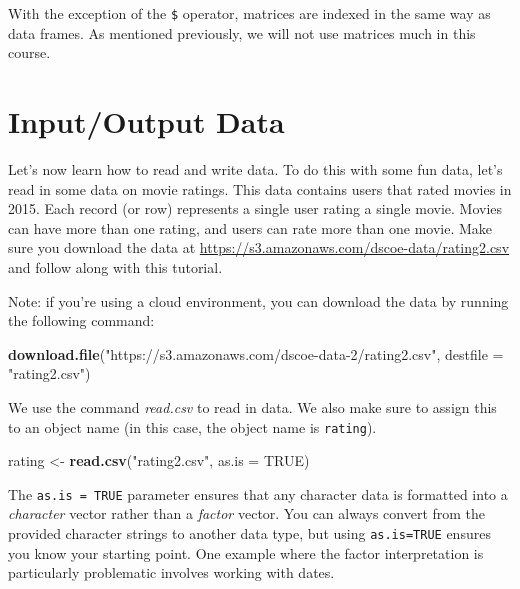 \documentclass[]{book}
\newenvironment{Shaded}{\begin{snugshade}}{\end{snugshade}}
\newcommand{\KeywordTok}[1]{\textcolor[rgb]{0.13,0.29,0.53}{\textbf{{#1}}}}
\newcommand{\DataTypeTok}[1]{\textcolor[rgb]{0.13,0.29,0.53}{{#1}}}
\newcommand{\StringTok}[1]{\textcolor[rgb]{0.31,0.60,0.02}{{#1}}}
\newcommand{\OtherTok}[1]{\textcolor[rgb]{0.56,0.35,0.01}{{#1}}}
\newcommand{\NormalTok}[1]{{#1}}
\begin{document}
With the exception of the \texttt{\$} operator, matrices are indexed in
the same way as data frames. As mentioned previously, we will not use
matrices much in this course.

\section{Input/Output Data}\label{inputoutput-data}

Let's now learn how to read and write data. To do this with some fun
data, let's read in some data on movie ratings. This data contains users
that rated movies in 2015. Each record (or row) represents a single user
rating a single movie. Movies can have more than one rating, and users
can rate more than one movie. Make sure you download the data at
\url{https://s3.amazonaws.com/dscoe-data/rating2.csv} and follow along
with this tutorial.

Note: if you're using a cloud environment, you can download the data by
running the following command:

\begin{Shaded}
\begin{Highlighting}[]
\KeywordTok{download.file}\NormalTok{(}\StringTok{"https://s3.amazonaws.com/dscoe-data-2/rating2.csv"}\NormalTok{, }\DataTypeTok{destfile =} \StringTok{"rating2.csv"}\NormalTok{)}
\end{Highlighting}
\end{Shaded}

We use the command \emph{read.csv} to read in data. We also make sure to
assign this to an object name (in this case, the object name is
\texttt{rating}).

\begin{Shaded}
\begin{Highlighting}[]
\NormalTok{rating <-}\StringTok{ }\KeywordTok{read.csv}\NormalTok{(}\StringTok{"rating2.csv"}\NormalTok{, }\DataTypeTok{as.is =} \OtherTok{TRUE}\NormalTok{)}
\end{Highlighting}
\end{Shaded}

The \texttt{as.is\ =\ TRUE} parameter ensures that any character data is
formatted into a \emph{character} vector rather than a \emph{factor}
vector. You can always convert from the provided character strings to
another data type, but using \texttt{as.is=TRUE} ensures you know your
starting point. One example where the factor interpretation is
particularly problematic involves working with dates.
\end{document}
